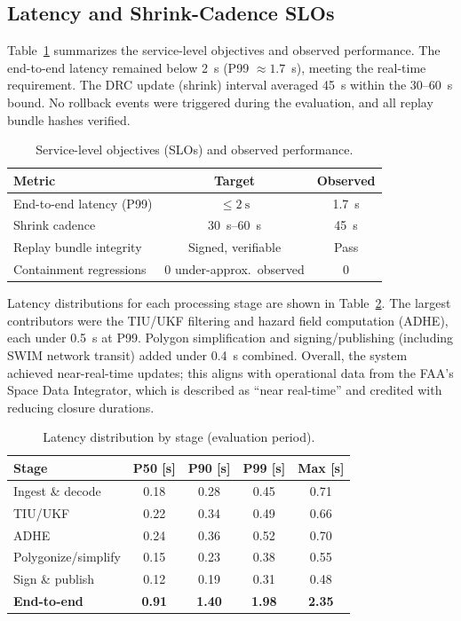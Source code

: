 \documentclass[journal]{new-aiaa}
\newcommand{\DRC}{\textsc{DRC}}
\newcommand{\SWIM}{\textsc{SWIM}}
\begin{document}
\subsection{Latency and Shrink-Cadence SLOs}
Table~\ref{tab:slo} summarizes the service-level objectives and observed performance. The end-to-end latency remained below 2~s (P99 $\approx1.7$~s), meeting the real-time requirement. The \DRC{} update (shrink) interval averaged 45~s within the $30$--$60$~s bound. No rollback events were triggered during the evaluation, and all replay bundle hashes verified.

\begin{table}[h!]
\centering
\caption{Service-level objectives (SLOs) and observed performance.}
\label{tab:slo}
\begin{tabular}{@{}lcc@{}}
\toprule
Metric & Target & Observed \\
\midrule
End-to-end latency (P99) & $\le \SI{2}{\second}$ & \SI{1.7}{\second} \\
Shrink cadence & \SIrange{30}{60}{\second} & \SI{45}{\second} \\
Replay bundle integrity & Signed, verifiable & Pass \\
Containment regressions & 0 under-approx.\ observed & 0 \\
\bottomrule
\end{tabular}
\end{table}

Latency distributions for each processing stage are shown in Table~\ref{tab:latency_summary}. The largest contributors were the TIU/UKF filtering and hazard field computation (ADHE), each under 0.5~s at P99. Polygon simplification and signing/publishing (including \SWIM{} network transit) added under 0.4~s combined. Overall, the system achieved near-real-time updates; this aligns with operational data from the FAA’s Space Data Integrator, which is described as “near real-time” and credited with reducing closure durations.\cite{FAA2023,FAA_OIG_2023}

\begin{table}[h!]
\centering
\caption{Latency distribution by stage (evaluation period).}
\label{tab:latency_summary}
\begin{tabular}{@{}lcccc@{}}
\toprule
Stage & P50 [s] & P90 [s] & P99 [s] & Max [s] \\
\midrule
Ingest \& decode & 0.18 & 0.28 & 0.45 & 0.71 \\
TIU/UKF & 0.22 & 0.34 & 0.49 & 0.66 \\
ADHE & 0.24 & 0.36 & 0.52 & 0.70 \\
Polygonize/simplify & 0.15 & 0.23 & 0.38 & 0.55 \\
Sign \& publish & 0.12 & 0.19 & 0.31 & 0.48 \\
\midrule
\textbf{End-to-end} & \textbf{0.91} & \textbf{1.40} & \textbf{1.98} & \textbf{2.35} \\
\bottomrule
\end{tabular}
\end{table}
\end{document}
